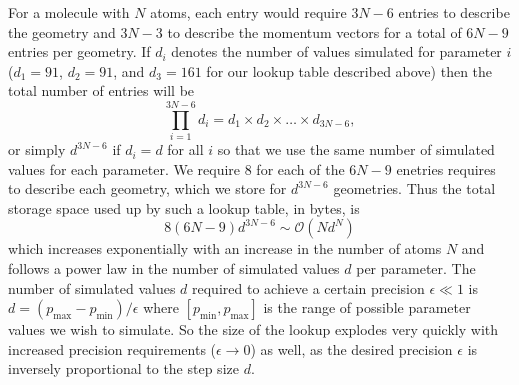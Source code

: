 
For a molecule with $N$ atoms, each entry would require $3N-6$ entries to describe the geometry and $3N-3$ to describe the momentum vectors for a total of $6N-9$ entries per geometry. If $d_i$ denotes the number of values simulated for parameter $i$ (\eg $d_1 = 91$, $d_2 = 91$, and $d_3 = 161$ for our lookup table described above) then the total number of entries will be 
\begin{equation}
\prod\limits_{i=1}^{3N-6} d_i = d_1 \times d_2 \times \dots \times d_{3N-6},
\end{equation}
or simply $d^{3N-6}$ if $d_i = d$ for all $i$ so that we use the same number of simulated values for each parameter. We require \SI{8}{\byte} for each of the $6N-9$ enetries requires to describe each geometry, which we store for $d^{3N-6}$ geometries. Thus the total storage space used up by such a lookup table, in bytes, is 
\begin{equation}
8(6N-9)d^{3N-6}\sim \mathcal{O}(Nd^{N})
\end{equation}
which increases exponentially with an increase in the number of atoms $N$ and follows a power law in the number of simulated values $d$ per parameter. The number of simulated values $d$ required to achieve a certain precision $\epsilon \ll 1$ is $d = (p_\mathrm{max} - p_\mathrm{min})/\epsilon$ where $[p_\mathrm{min}, p_\mathrm{max}]$ is the range of possible parameter values we wish to simulate. So the size of the lookup explodes very quickly with increased precision requirements ($\epsilon \rightarrow 0$) as well, as the desired precision $\epsilon$ is inversely proportional to the step size $d$.

